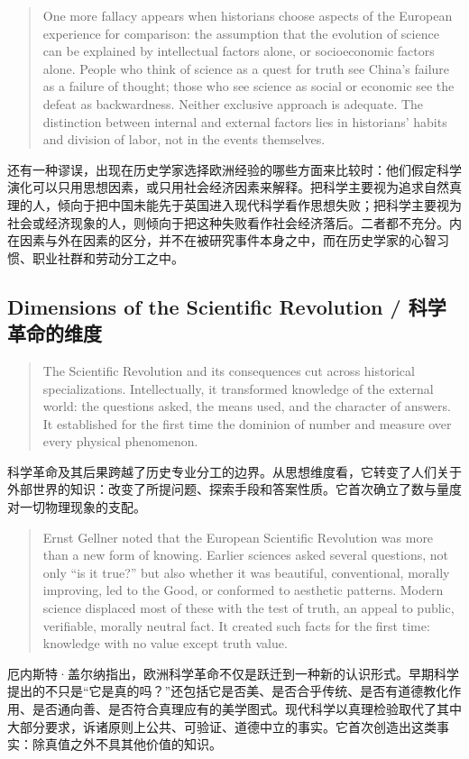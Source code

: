 \documentclass[UTF8,zihao=-4]{ctexart}
\newenvironment{enblock}
  {\par\smallskip\noindent{\scriptsize\bfseries English}\par\begin{quote}\small}
  {\end{quote}}
\newenvironment{zhblock}
  {\par\noindent{\scriptsize\bfseries 中文}\par}
  {\par\medskip}
\begin{document}
\begin{enblock}
One more fallacy appears when historians choose aspects of the European experience for comparison: the assumption that the evolution of science can be explained by intellectual factors alone, or socioeconomic factors alone. People who think of science as a quest for truth see China's failure as a failure of thought; those who see science as social or economic see the defeat as backwardness. Neither exclusive approach is adequate. The distinction between internal and external factors lies in historians' habits and division of labor, not in the events themselves.
\end{enblock}
\begin{zhblock}
还有一种谬误，出现在历史学家选择欧洲经验的哪些方面来比较时：他们假定科学演化可以只用思想因素，或只用社会经济因素来解释。把科学主要视为追求自然真理的人，倾向于把中国未能先于英国进入现代科学看作思想失败；把科学主要视为社会或经济现象的人，则倾向于把这种失败看作社会经济落后。二者都不充分。内在因素与外在因素的区分，并不在被研究事件本身之中，而在历史学家的心智习惯、职业社群和劳动分工之中。
\end{zhblock}

\subsection*{Dimensions of the Scientific Revolution / 科学革命的维度}

\begin{enblock}
The Scientific Revolution and its consequences cut across historical specializations. Intellectually, it transformed knowledge of the external world: the questions asked, the means used, and the character of answers. It established for the first time the dominion of number and measure over every physical phenomenon.
\end{enblock}
\begin{zhblock}
科学革命及其后果跨越了历史专业分工的边界。从思想维度看，它转变了人们关于外部世界的知识：改变了所提问题、探索手段和答案性质。它首次确立了数与量度对一切物理现象的支配。
\end{zhblock}

\begin{enblock}
Ernst Gellner noted that the European Scientific Revolution was more than a new form of knowing. Earlier sciences asked several questions, not only ``is it true?'' but also whether it was beautiful, conventional, morally improving, led to the Good, or conformed to aesthetic patterns. Modern science displaced most of these with the test of truth, an appeal to public, verifiable, morally neutral fact. It created such facts for the first time: knowledge with no value except truth value.
\end{enblock}
\begin{zhblock}
厄内斯特·盖尔纳指出，欧洲科学革命不仅是跃迁到一种新的认识形式。早期科学提出的不只是“它是真的吗？”还包括它是否美、是否合乎传统、是否有道德教化作用、是否通向善、是否符合真理应有的美学图式。现代科学以真理检验取代了其中大部分要求，诉诸原则上公共、可验证、道德中立的事实。它首次创造出这类事实：除真值之外不具其他价值的知识。
\end{zhblock}
\end{document}
